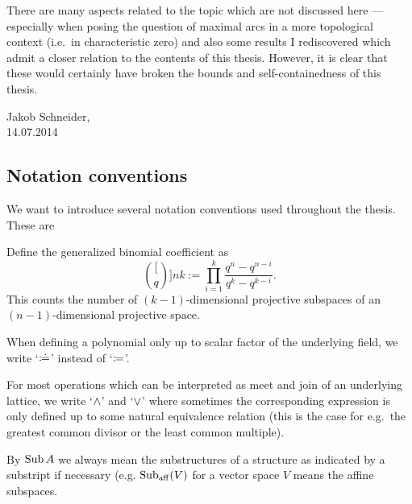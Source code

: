 There are many aspects related to the topic which are not discussed here --- especially when posing the question of maximal arcs in a more topological context (i.e.~in characteristic zero) and also some results I rediscovered which admit a closer relation to the contents of this thesis. However, it is clear that these would certainly have broken the bounds and self-containedness of this thesis.

\begin{flushright}
    Jakob Schneider,\\
    14.07.2014
\end{flushright}

\subsection*{Notation conventions}

We want to introduce several notation conventions used throughout the thesis.
These are 
\begin{definition}
    Define the generalized binomial coefficient as
    $$
    \binom[q]{n}{k}:= \prod_{i=1}^{k}{\frac{q^n-q^{n-i}}{q^k-q^{k-i}}}.
    $$
    This counts the number of $(k-1)$-dimensional projective subspaces of an $(n-1)$-dimensional projective space.
\end{definition}

When defining a polynomial only up to scalar factor of the underlying field, we write `$\mathrel{\mathrel{\mathop:}\mkern-1.2mu\doteq}$' instead of `$\mathrel{\mathrel{\mathop:}\mkern-1.2mu=}$'.

For most operations which can be interpreted as meet and join of an underlying lattice, we write `$\wedge$' and `$\vee$' where sometimes the corresponding expression is only defined up to some natural equivalence relation (this is the case for e.g.~the greatest common divisor or the least common multiple).


By $\mathop\mathrm{Sub}\nolimits A$ we always mean the substructures of a structure as indicated by a substript if necessary (e.g. $\mathop\mathrm{Sub}\nolimits_{\mathop\mathrm{aff}}(V)$ for a vector space $V$ means the affine subspaces.